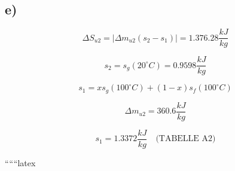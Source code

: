\subsection*{e)}
\[
\Delta S_{u2} = \left| \Delta m_{u2} (s_{2} - s_{1}) \right| = 1.376.28 \frac{kJ}{kg}
\]

\[
s_{2} = s_{g} (20^\circ C) = 0.9598 \frac{kJ}{kg}
\]

\[
s_{1} = x s_{g} (100^\circ C) + (1 - x) s_{f} (100^\circ C)
\]

\[
\Delta m_{u2} = 360.6 \frac{kJ}{kg}
\]

\[
s_{1} = 1.3372 \frac{kJ}{kg} \quad \text{(TABELLE A2)}
\]

``````latex



